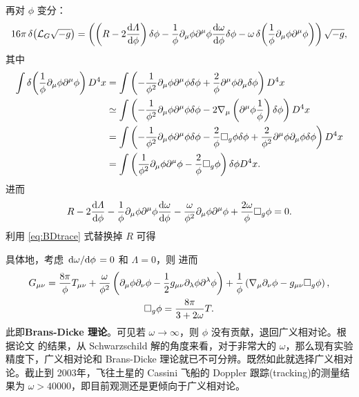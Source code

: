 再对 $\phi$ 变分：
\[16\pi\var(\mathcal L_G\sqrt{-g})= \left(\left(R-2\dv{\Lambda}{\phi}\right)\var\phi - \frac{1}{\phi}\partial_\mu \phi \partial^\mu \phi\dv{\omega}{\phi}\var\phi - \omega\var(\frac{1}{\phi}\partial_\mu \phi \partial^\mu \phi)\right) \sqrt{-g},\]
其中
\begin{align*}
    \int \var(\frac{1}{\phi}\partial_\mu \phi \partial^\mu \phi) D^4 x
    & =\int \left(-\frac{1}{\phi^2} \partial_\mu \phi \partial^\mu \phi \delta \phi+\frac{2}{\phi} \partial^\mu \phi  \partial_\mu \delta \phi\right) D^4 x \\
    & \simeq \int \left(-\frac{1}{\phi^2} \partial_\mu \phi \partial^\mu \phi \delta \phi-2 \nabla_\mu\left(\partial^\mu \phi \frac{1}{\phi}\right) \delta \phi\right) D^4 x \\
    & =\int\left(-\frac{1}{\phi^2} \partial_\mu \phi \partial^\mu \phi \delta \phi-\frac{2}{\phi} \square_g \phi \delta \phi+\frac{2}{\phi^2} \partial^\mu \phi \partial_\mu \phi \var\phi\right) D^4 x\\
    & =\int\left(\frac{1}{\phi^2} \partial_\mu \phi \partial^\mu \phi  - \frac{2}{\phi} \square_g \phi \right)\delta \phi D^4 x.
\end{align*}
进而
\[
    R-2\dv{\Lambda}{\phi}-\frac{1}{\phi}\partial_\mu \phi \partial^\mu \phi\dv{\omega}{\phi}- \frac{\omega}{\phi^2} \partial_\mu \phi \partial^\mu \phi  + \frac{2\omega}{\phi} \square_g \phi=0.
\]
利用 \eqref{eq:BDtrace} 式替换掉 $R$ 可得

具体地，考虑 $\dv*{\omega}{\phi}=0$ 和 $\Lambda=0$，则
进而
\begin{gather}
    G_{\mu \nu}=\frac{8 \pi}{\phi} T_{\mu \nu}+\frac{\omega}{\phi^2}\left(\partial_\mu \phi \partial_\nu \phi-\frac{1}{2} g_{\mu \nu} \partial_\lambda \phi \partial^\lambda \phi\right)+\frac{1}{\phi}\left(\nabla_\mu \partial_\nu \phi-g_{\mu \nu} \square_g \phi\right), \\
    \square_g\phi=\frac{8 \pi}{3+2 \omega} T.
\end{gather}
此即\textbf{Brans-Dicke 理论}。可见若 $\omega\to\infty$，则 $\phi$ 没有贡献，退回广义相对论。根据论文 \cite{Bhabra} 的结果，从 Schwarzschild 解的角度来看，对于非常大的 $\omega$，那么现有实验精度下，广义相对论和 Brans-Dicke 理论就已不可分辨。既然如此就选择广义相对论。截止到 2003年，飞往土星的 Cassini 飞船的 Doppler 跟踪(tracking)\cite{Will-thesis}的测量结果为 $\omega>40000$，即目前观测还是更倾向于广义相对论。

